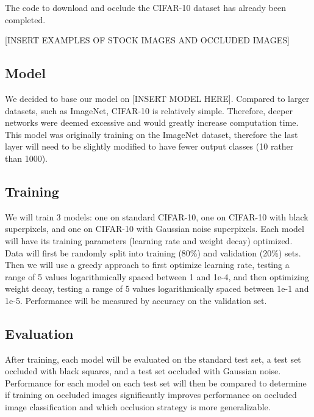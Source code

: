 \documentclass{article}
\begin{document}
The code to download and occlude the CIFAR-10 dataset has already been completed. 
\vspace{3mm} %

[INSERT EXAMPLES OF STOCK IMAGES AND OCCLUDED IMAGES]
\subsection{Model}
We decided to base our model on [INSERT MODEL HERE]. Compared to larger datasets, such as ImageNet, CIFAR-10 is relatively simple. Therefore, deeper networks were deemed excessive and would greatly increase computation time. This model was originally training on the ImageNet dataset, therefore the last layer will need to be slightly modified to have fewer output classes (10 rather than 1000). 
\subsection{Training}
We will train 3 models: one on standard CIFAR-10, one on CIFAR-10 with black superpixels, and one on CIFAR-10 with Gaussian noise superpixels. Each model will have its training parameters (learning rate and weight decay) optimized. Data will first be randomly split into training (80\%) and validation (20\%) sets. Then we will use a greedy approach to first optimize learning rate, testing a range of 5 values logarithmically spaced between 1 and 1e-4, and then optimizing weight decay, testing a range of 5 values logarithmically spaced between 1e-1 and 1e-5. Performance will be measured by accuracy on the validation set. 
\subsection{Evaluation}
After training, each model will be evaluated on the standard test set, a test set occluded with black squares, and a test set occluded with Gaussian noise. Performance for each model on each test set will then be compared to determine if training on occluded images significantly improves performance on occluded image classification and which occlusion strategy is more generalizable. 
\end{document}

